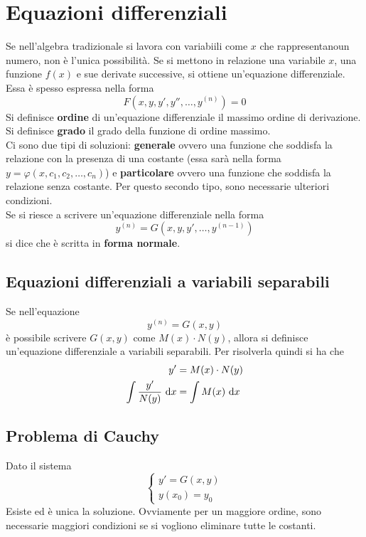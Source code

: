 
\section{Equazioni differenziali}
Se nell'algebra tradizionale si lavora con variabiili come $x$ che rappresentanoun numero, non è
l'unica possibilità. Se si mettono in relazione una variabile $x$, una funzione $f(x)$ e sue
derivate successive, si ottiene un'equazione differenziale. Essa è spesso espressa nella forma
\begin{equation*}
  F\left(x,y,y',y'',\ldots,y^{(n)}\right)=0
\end{equation*}
Si definisce \textbf{ordine} di un'equazione differenziale il massimo ordine di derivazione. Si
definisce \textbf{grado} il grado della funzione di ordine massimo.\\
Ci sono due tipi di soluzioni: \textbf{generale} ovvero una funzione che soddisfa la relazione con la
presenza di una costante (essa sarà nella forma $y=\varphi(x,c_1,c_2,\ldots,c_n)$) e 
\textbf{particolare} ovvero una funzione che soddisfa la relazione senza costante. Per questo secondo
tipo, sono necessarie ulteriori condizioni.\\
Se si riesce a scrivere un'equazione differenziale nella forma
\begin{equation*}
  y^{(n)}=G(x,y,y',\ldots,y^{(n-1)})
\end{equation*}
si dice che è scritta in \textbf{forma normale}.

\subsection{Equazioni differenziali a variabili separabili}
Se nell'equazione
\begin{equation*}
  y^{(n)}=G(x,y) 
\end{equation*}
è possibile scrivere $G(x,y)$ come $M(x)\cdot N(y)$, allora si definisce un'equazione differenziale a
variabili separabili. Per risolverla quindi si ha che
\begin{align*}
  y' &= M(x)\cdot N(y)\\
  \int \frac{y'}{N(y)}\,\mathop{}\!\mathrm{d} x &= \int M(x)\,\mathop{}\!\mathrm{d} x
\end{align*}

\subsection{Problema di Cauchy}
Dato il sistema
\begin{equation*}
  \begin{cases}
    y' = G(x,y)\\
    y(x_0) = y_0
  \end{cases}
\end{equation*}
Esiste ed è unica la soluzione. Ovviamente per un maggiore ordine, sono necessarie maggiori 
condizioni se si vogliono eliminare tutte le costanti.

